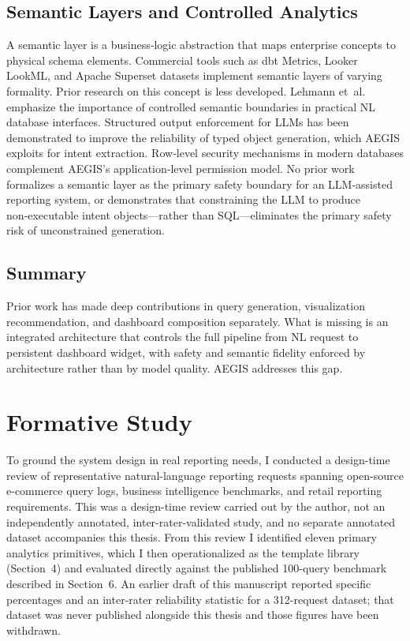 \documentclass[11pt]{article}
\begin{document}
\subsection{Semantic Layers and Controlled Analytics}
A semantic layer is a business‑logic abstraction that maps enterprise concepts to physical schema elements. Commercial tools such as dbt Metrics, Looker LookML, and Apache Superset datasets implement semantic layers of varying formality. Prior research on this concept is less developed. Lehmann et~al.~\cite{lehmann2022building} emphasize the importance of controlled semantic boundaries in practical NL database interfaces. Structured output enforcement for LLMs\cite{openai2024structured} has been demonstrated to improve the reliability of typed object generation, which AEGIS exploits for intent extraction. Row‑level security mechanisms in modern databases\cite{postgresql} complement AEGIS's application‑level permission model. No prior work formalizes a semantic layer as the primary safety boundary for an LLM‑assisted reporting system, or demonstrates that constraining the LLM to produce non‑executable intent objects—rather than SQL—eliminates the primary safety risk of unconstrained generation.

\subsection{Summary}
Prior work has made deep contributions in query generation, visualization recommendation, and dashboard composition separately. What is missing is an integrated architecture that controls the full pipeline from NL request to persistent dashboard widget, with safety and semantic fidelity enforced by architecture rather than by model quality. AEGIS addresses this gap.

\section{Formative Study\label{sec:formative}}
To ground the system design in real reporting needs, I conducted a design-time review of representative natural-language reporting requests spanning open-source e-commerce query logs, business intelligence benchmarks, and retail reporting requirements. This was a design-time review carried out by the author, not an independently annotated, inter-rater-validated study, and no separate annotated dataset accompanies this thesis. From this review I identified eleven primary analytics primitives, which I then operationalized as the template library (Section~4) and evaluated directly against the published 100-query benchmark described in Section~6. An earlier draft of this manuscript reported specific percentages and an inter-rater reliability statistic for a 312-request dataset; that dataset was never published alongside this thesis and those figures have been withdrawn.
\end{document}
